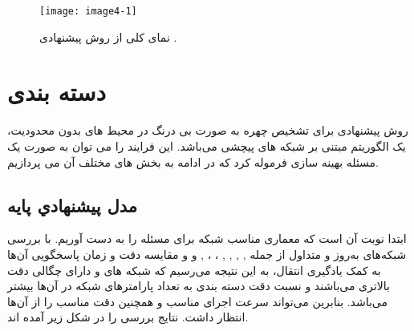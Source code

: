 \begin{figure}[h]
\centering
  \texttt{[image: image4-1]}
  \caption{نمای کلی از روش پیشنهادی \cite{ref1}.}
  \label{image2-1}
\end{figure}

%
%
\section{دسته بندی}
روش پیشنهادی برای تشخیص چهره به صورت بی درنگ در محیط های بدون محدودیت، یک الگوریتم مبتنی بر شبکه های پیچشی می‌باشد. این فرایند را می توان به صورت یک مسئله بهینه سازی فرموله کرد که در ادامه به بخش های مختلف آن می پردازیم.

\subsection{مدل پيشنهادي پايه}
ابتدا نوبت آن است که معماری مناسب شبکه برای مسئله را به دست آوریم. با بررسی شبکه‌های به‌روز و متداول از جمله
,
,
,
,
،
،
,
و
و مقایسه دقت و زمان پاسخگویی آن‌ها به کمک یادگیری انتقال، به این نتیجه می‌رسیم که شبکه های  و  دارای چگالی دقت بالاتری می‌باشند و نسبت دقت دسته بندی به تعداد پارامترهای شبکه در آن‌ها بیشتر می‌باشد. بنابرین می‌تواند سرعت اجرای مناسب و همچنین دقت مناسب را از آن‌ها انتظار داشت. نتایج بررسی را در شکل زیر آمده اند.

